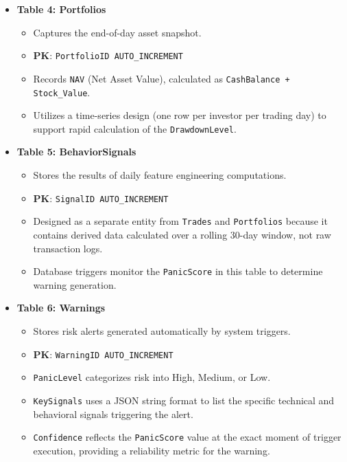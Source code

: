 \begin{itemize}
    \item \textbf{Table 4: Portfolios}
    \begin{itemize}
        \item Captures the end-of-day asset snapshot.
        \item \textbf{PK}: \texttt{PortfolioID AUTO\_INCREMENT}
        \item Records \texttt{NAV} (Net Asset Value), calculated as \texttt{CashBalance + Stock\_Value}.
        \item Utilizes a time-series design (one row per investor per trading day) to support rapid calculation of the \texttt{DrawdownLevel}.
    \end{itemize}

    \item \textbf{Table 5: BehaviorSignals}
    \begin{itemize}
        \item Stores the results of daily feature engineering computations.
        \item \textbf{PK}: \texttt{SignalID AUTO\_INCREMENT}
        \item Designed as a separate entity from \texttt{Trades} and \texttt{Portfolios} because it contains derived data calculated over a rolling 30-day window, not raw transaction logs.
        \item Database triggers monitor the \texttt{PanicScore} in this table to determine warning generation.
    \end{itemize}

    \item \textbf{Table 6: Warnings}
    \begin{itemize}
        \item Stores risk alerts generated automatically by system triggers.
        \item \textbf{PK}: \texttt{WarningID AUTO\_INCREMENT}
        \item \texttt{PanicLevel} categorizes risk into High, Medium, or Low.
        \item \texttt{KeySignals} uses a JSON string format to list the specific technical and behavioral signals triggering the alert.
        \item \texttt{Confidence} reflects the \texttt{PanicScore} value at the exact moment of trigger execution, providing a reliability metric for the warning.
    \end{itemize}
\end{itemize}

